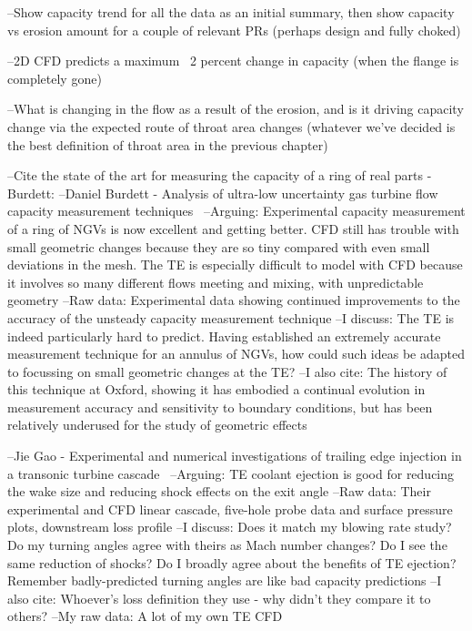 \documentclass[a4paper, 11pt, twoside]{report}
\begin{document}
--Show capacity trend for all the data as an initial summary, then show capacity vs erosion amount for a couple of relevant PRs (perhaps design and fully choked)

--2D CFD predicts a maximum ~2 percent change in capacity (when the flange is completely gone)

--What is changing in the flow as a result of the erosion, and is it driving capacity change via the expected route of throat area changes (whatever we've decided is the best definition of throat area in the previous chapter)

--Cite the state of the art for measuring the capacity of a ring of real parts - Burdett:
	--Daniel Burdett - Analysis of ultra-low uncertainty gas turbine flow capacity measurement techniques~\cite{burdett_capacity_measurement}
		--Arguing: Experimental capacity measurement of a ring of NGVs is now excellent and getting better. CFD still has trouble with small geometric changes because they are so tiny compared with even small deviations in the mesh. The TE is especially difficult to model with CFD because it involves so many different flows meeting and mixing, with unpredictable geometry
		--Raw data: Experimental data showing continued improvements to the accuracy of the unsteady capacity measurement technique
		--I discuss: The TE is indeed particularly hard to predict. Having established an extremely accurate measurement technique for an annulus of NGVs, how could such ideas be adapted to focussing on small geometric changes at the TE?
		--I also cite: The history of this technique at Oxford, showing it has embodied a continual evolution in measurement accuracy and sensitivity to boundary conditions, but has been relatively underused for the study of geometric effects
		
--Jie Gao - Experimental and numerical investigations of trailing edge injection in a transonic turbine cascade~\cite{gao_te}
	--Arguing: TE coolant ejection is good for reducing the wake size and reducing shock effects on the exit angle
	--Raw data: Their experimental and CFD linear cascade, five-hole probe data and surface pressure plots, downstream loss profile
	--I discuss: Does it match my blowing rate study? Do my turning angles agree with theirs as Mach number changes? Do I see the same reduction of shocks? Do I broadly agree about the benefits of TE ejection? Remember badly-predicted turning angles are like bad capacity predictions
	--I also cite: Whoever's loss definition they use - why didn't they compare it to others?
	--My raw data: A lot of my own TE CFD
	
\end{document}
